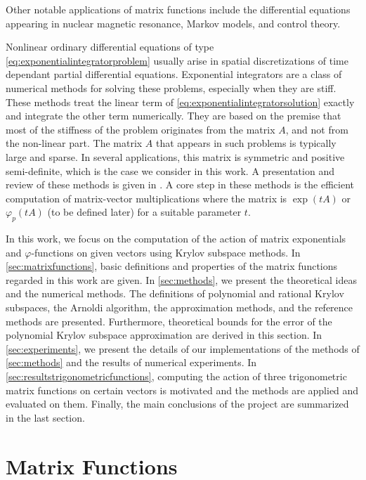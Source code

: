 Other notable applications of matrix functions include the differential equations
appearing in nuclear magnetic resonance, Markov models, and control theory.

Nonlinear ordinary differential equations of type \eqref{eq:exponentialintegratorproblem}
usually arise in spatial discretizations of time dependant partial differential equations.
Exponential integrators are a class of numerical methods for solving these problems, especially
when they are stiff. These methods treat the linear term of \eqref{eq:exponentialintegratorsolution}
exactly and integrate the other term numerically. They are based on the premise that most of the
stiffness of the problem originates from the matrix $A$, and not from the non-linear part. The matrix
$A$ that appears in such problems is typically large and sparse. In several applications, this matrix
is symmetric and positive semi-definite, which is the case we consider in this work.
A presentation and review of these methods is given in \cite{minchev2005review}.
A core step in these methods is the efficient computation of matrix-vector multiplications where
the matrix is $\exp(tA)$ or $\varphi_p(tA)$ (to be defined later) for a suitable parameter $t$.

In this work, we focus on the computation of the action of matrix exponentials and
$\varphi$-functions on given vectors using Krylov subspace methods.
In \autoref{sec:matrixfunctions}, basic definitions and properties of the matrix functions
regarded in this work are given. In \autoref{sec:methods}, we present the theoretical ideas
and the numerical methods. The definitions of polynomial and rational Krylov subspaces,
the Arnoldi algorithm, the approximation methods, and the reference methods are presented.
Furthermore, theoretical bounds for the error of the polynomial Krylov subspace approximation
are derived in this section. In \autoref{sec:experiments}, we present the details of our
implementations of the methods of \autoref{sec:methods} and the results of numerical experiments.
In \autoref{sec:resultstrigonometricfunctions}, computing the action of three trigonometric
matrix functions on certain vectors is motivated and the methods are applied and evaluated on them.
Finally, the main conclusions of the project are summarized in the last section.

\section{Matrix Functions}
\label{sec:matrixfunctions}

